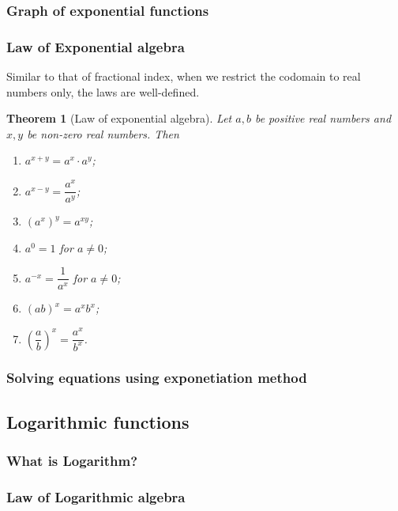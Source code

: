 \documentclass[12pt]{article}
\newtheorem*{theorem}{Theorem}
\begin{document}
    \subsubsection*{Graph of exponential functions}

    \subsubsection*{Law of Exponential algebra}

    Similar to that of fractional index, when we restrict the codomain to real numbers only, the laws are well-defined.

    \begin{theorem}[Law of exponential algebra]
        Let $a,b$ be positive real numbers and $x,y$ be non-zero real numbers. Then\begin{enumerate}
            \item $a^{x+y}=a^x\cdot a^y$;
            \item $a^{x-y}=\dfrac{a^x}{a^y}$;
            \item $(a^x)^y=a^{xy}$;
            \item $a^0=1$ for $a\neq 0$;
            \item $a^{-x}=\dfrac{1}{a^x}$ for $a\neq 0$;
            \item $(ab)^x=a^x b^x$;
            \item $(\dfrac{a}{b})^x=\dfrac{a^x}{b^x}$.
        \end{enumerate}
    \end{theorem}

    \subsubsection*{Solving equations using exponetiation method}

    \subsection{Logarithmic functions}

    \subsubsection*{What is Logarithm?}

    \subsubsection*{Law of Logarithmic algebra}
\end{document}
